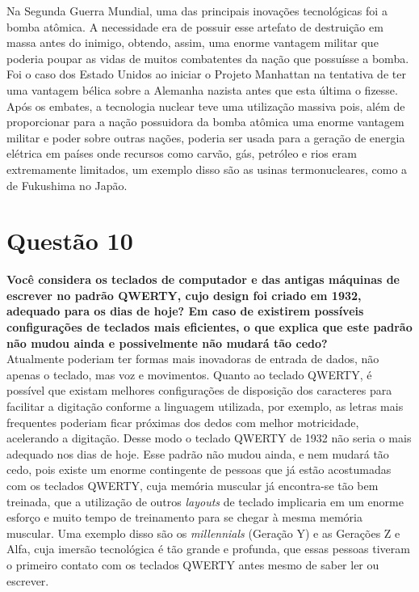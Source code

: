 Na Segunda Guerra Mundial, uma das principais inovações tecnológicas foi a bomba atômica. A necessidade era de possuir esse artefato de destruição em massa antes do inimigo, obtendo, assim, uma enorme vantagem militar que poderia poupar as vidas de muitos combatentes da nação que possuísse a bomba. Foi o caso dos Estado Unidos ao iniciar o Projeto Manhattan na tentativa de ter uma vantagem bélica sobre a Alemanha nazista antes que esta última o fizesse. Após os embates, a tecnologia nuclear teve uma utilização massiva pois, além de proporcionar para a nação possuidora da bomba atômica uma enorme vantagem militar e poder sobre outras nações, poderia ser usada para a geração de energia elétrica em países onde recursos como carvão, gás, petróleo e rios eram extremamente limitados, um exemplo disso são as usinas termonucleares, como a de Fukushima no Japão.


\section{Questão 10}
\label{sec:q10}
\textbf{Você considera os teclados de computador e das antigas máquinas de escrever no padrão QWERTY, cujo design foi criado em 1932, adequado para os dias de hoje? Em caso de existirem possíveis configurações de teclados mais eficientes, o que explica que este padrão não mudou ainda e possivelmente não mudará tão cedo?} \\

Atualmente poderiam ter formas mais inovadoras de entrada de dados, não apenas o teclado, mas voz e movimentos. Quanto ao teclado QWERTY, é possível que existam melhores configurações de disposição dos caracteres para facilitar a digitação conforme a linguagem utilizada, por exemplo, as letras mais frequentes poderiam ficar próximas dos dedos com melhor motricidade, acelerando a digitação. Desse modo o teclado QWERTY de 1932 não seria o mais adequado nos dias de hoje. Esse padrão não mudou ainda, e nem mudará tão cedo, pois existe um enorme contingente de pessoas que já estão acostumadas com os teclados QWERTY, cuja memória muscular já encontra-se tão bem treinada, que a utilização de outros \textit{layouts} de teclado implicaria em um enorme esforço e muito tempo de treinamento para se chegar à mesma memória muscular. Uma exemplo disso são os \textit{millennials} (Geração Y) e as Gerações Z e Alfa, cuja imersão tecnológica é tão grande e profunda, que essas pessoas tiveram o primeiro contato com os teclados QWERTY antes mesmo de saber ler ou escrever.

